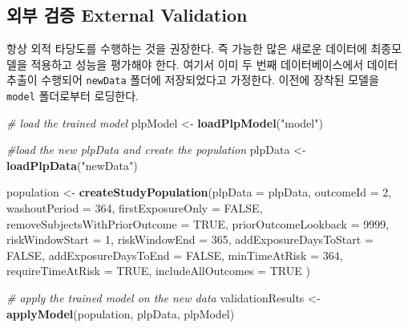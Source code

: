 \documentclass[10.5pt]{book}
\newenvironment{Shaded}{\begin{snugshade}}{\end{snugshade}}
\newcommand{\KeywordTok}[1]{\textcolor[rgb]{0.13,0.29,0.53}{\textbf{#1}}}
\newcommand{\DataTypeTok}[1]{\textcolor[rgb]{0.13,0.29,0.53}{#1}}
\newcommand{\DecValTok}[1]{\textcolor[rgb]{0.00,0.00,0.81}{#1}}
\newcommand{\StringTok}[1]{\textcolor[rgb]{0.31,0.60,0.02}{#1}}
\newcommand{\CommentTok}[1]{\textcolor[rgb]{0.56,0.35,0.01}{\textit{#1}}}
\newcommand{\OtherTok}[1]{\textcolor[rgb]{0.56,0.35,0.01}{#1}}
\newcommand{\NormalTok}[1]{#1}
\theoremstyle{definition}
\theoremstyle{definition}
\theoremstyle{definition}
\theoremstyle{remark}
\begin{document}
\subsection{외부 검증 External Validation}\label{--external-validation}

항상 외적 타당도를 수행하는 것을 권장한다. 즉 가능한 많은 새로운
데이터에 최종모델을 적용하고 성능을 평가해야 한다. 여기서 이미 두 번째
데이터베이스에서 데이터 추출이 수행되어 \texttt{newData} 폴더에
저장되었다고 가정한다. 이전에 장착된 모델을 \texttt{model} 폴더로부터
로딩한다.

\begin{Shaded}
\begin{Highlighting}[]
\CommentTok{# load the trained model}
\NormalTok{plpModel <-}\StringTok{ }\KeywordTok{loadPlpModel}\NormalTok{(}\StringTok{"model"}\NormalTok{)}

\CommentTok{#load the new plpData and create the population}
\NormalTok{plpData <-}\StringTok{ }\KeywordTok{loadPlpData}\NormalTok{(}\StringTok{"newData"}\NormalTok{)}

\NormalTok{population <-}\StringTok{ }\KeywordTok{createStudyPopulation}\NormalTok{(}\DataTypeTok{plpData =}\NormalTok{ plpData,}
                                    \DataTypeTok{outcomeId =} \DecValTok{2}\NormalTok{,}
                                    \DataTypeTok{washoutPeriod =} \DecValTok{364}\NormalTok{,}
                                    \DataTypeTok{firstExposureOnly =} \OtherTok{FALSE}\NormalTok{,}
                                    \DataTypeTok{removeSubjectsWithPriorOutcome =} \OtherTok{TRUE}\NormalTok{,}
                                    \DataTypeTok{priorOutcomeLookback =} \DecValTok{9999}\NormalTok{,}
                                    \DataTypeTok{riskWindowStart =} \DecValTok{1}\NormalTok{,}
                                    \DataTypeTok{riskWindowEnd =} \DecValTok{365}\NormalTok{,}
                                    \DataTypeTok{addExposureDaysToStart =} \OtherTok{FALSE}\NormalTok{,}
                                    \DataTypeTok{addExposureDaysToEnd =} \OtherTok{FALSE}\NormalTok{,}
                                    \DataTypeTok{minTimeAtRisk =} \DecValTok{364}\NormalTok{,}
                                    \DataTypeTok{requireTimeAtRisk =} \OtherTok{TRUE}\NormalTok{,}
                                    \DataTypeTok{includeAllOutcomes =} \OtherTok{TRUE}
\NormalTok{)}

\CommentTok{# apply the trained model on the new data}
\NormalTok{validationResults <-}\StringTok{ }\KeywordTok{applyModel}\NormalTok{(population, plpData, plpModel)}
\end{Highlighting}
\end{Shaded}
\end{document}
